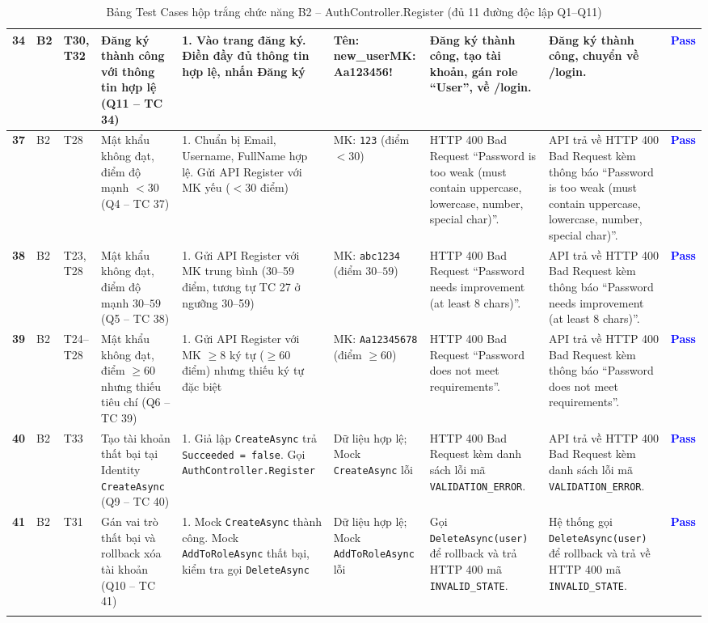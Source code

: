 \documentclass[11pt,a4paper]{article}
\begin{document}
\begin{longtable}{|C{0.8cm}|C{0.75cm}|C{0.95cm}|L{2.0cm}|L{3.0cm}|L{2.25cm}|L{2.6cm}|L{2.5cm}|C{0.85cm}|}
\textbf{34} & B2 & T30, T32 & Đăng ký thành công với thông tin hợp lệ (Q11 -- TC 34) & 1. Vào trang đăng ký. Điền đầy đủ thông tin hợp lệ, nhấn Đăng ký & Tên: new\_user\newline MK: Aa123456! & Đăng ký thành công, tạo tài khoản, gán role ``User'', về /login. & Đăng ký thành công, chuyển về /login. & \textcolor{blue}{\textbf{Pass}} \\ \hline
\textbf{37} & B2 & T28 & Mật khẩu không đạt, điểm độ mạnh $< 30$ (Q4 -- TC 37) & 1. Chuẩn bị Email, Username, FullName hợp lệ. Gửi API Register với MK yếu ($<30$ điểm) & MK: \texttt{123} (điểm $< 30$) & HTTP 400 Bad Request ``Password is too weak (must contain uppercase, lowercase, number, special char)''. & API trả về HTTP 400 Bad Request kèm thông báo ``Password is too weak (must contain uppercase, lowercase, number, special char)''. & \textcolor{blue}{\textbf{Pass}} \\ \hline
\textbf{38} & B2 & T23, T28 & Mật khẩu không đạt, điểm độ mạnh $30\text{--}59$ (Q5 -- TC 38) & 1. Gửi API Register với MK trung bình (30--59 điểm, tương tự TC 27 ở ngưỡng 30--59) & MK: \texttt{abc1234} (điểm $30\text{--}59$) & HTTP 400 Bad Request ``Password needs improvement (at least 8 chars)''. & API trả về HTTP 400 Bad Request kèm thông báo ``Password needs improvement (at least 8 chars)''. & \textcolor{blue}{\textbf{Pass}} \\ \hline
\textbf{39} & B2 & T24--T28 & Mật khẩu không đạt, điểm $\ge 60$ nhưng thiếu tiêu chí (Q6 -- TC 39) & 1. Gửi API Register với MK $\ge 8$ ký tự ($\ge 60$ điểm) nhưng thiếu ký tự đặc biệt & MK: \texttt{Aa12345678} (điểm $\ge 60$) & HTTP 400 Bad Request ``Password does not meet requirements''. & API trả về HTTP 400 Bad Request kèm thông báo ``Password does not meet requirements''. & \textcolor{blue}{\textbf{Pass}} \\ \hline
\textbf{40} & B2 & T33 & Tạo tài khoản thất bại tại Identity \texttt{CreateAsync} (Q9 -- TC 40) & 1. Giả lập \texttt{CreateAsync} trả \texttt{Succeeded = false}. Gọi \texttt{AuthController.Register} & Dữ liệu hợp lệ; Mock \texttt{CreateAsync} lỗi & HTTP 400 Bad Request kèm danh sách lỗi mã \texttt{VALIDATION\_ERROR}. & API trả về HTTP 400 Bad Request kèm danh sách lỗi mã \texttt{VALIDATION\_ERROR}. & \textcolor{blue}{\textbf{Pass}} \\ \hline
\textbf{41} & B2 & T31 & Gán vai trò thất bại và rollback xóa tài khoản (Q10 -- TC 41) & 1. Mock \texttt{CreateAsync} thành công. Mock \texttt{AddToRoleAsync} thất bại, kiểm tra gọi \texttt{DeleteAsync} & Dữ liệu hợp lệ; Mock \texttt{AddToRoleAsync} lỗi & Gọi \texttt{DeleteAsync(user)} để rollback và trả HTTP 400 mã \texttt{INVALID\_STATE}. & Hệ thống gọi \texttt{DeleteAsync(user)} để rollback và trả về HTTP 400 mã \texttt{INVALID\_STATE}. & \textcolor{blue}{\textbf{Pass}} \\ \hline
\caption{Bảng Test Cases hộp trắng chức năng B2 -- AuthController.Register (đủ 11 đường độc lập Q1--Q11)}
\end{longtable}
\end{document}
